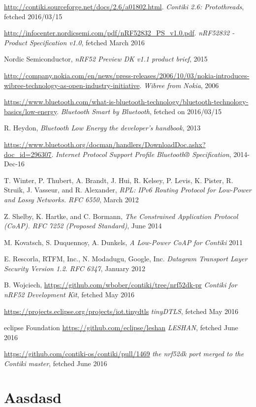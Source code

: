 \documentclass{article}
\begin{document}
\begin{thebibliography}{9}

 \url{http://contiki.sourceforge.net/docs/2.6/a01802.html}.
\emph{Contiki 2.6: Protothreads}, fetched 2016/03/15

\url{http://infocenter.nordicsemi.com/pdf/nRF52832_PS_v1.0.pdf}.
\emph{nRF52832 - Product Specification v1.0}, fetched March 2016

 Nordic Semiconductor,
\emph{nRF52 Preview DK v1.1 product brief}, 2015

 \url{http://company.nokia.com/en/news/press-releases/2006/10/03/nokia-introduces-wibree-technology-as-open-industry-initiative}.
\emph{Wibree from Nokia}, 2006

 \url{https://www.bluetooth.com/what-is-bluetooth-technology/bluetooth-technology-basics/low-energy}.
\emph{Bluetooth Smart by Bluetooth}, fetched on 2016/03/15

 R. Heydon,
\emph{Bluetooth Low Energy the developer's handbook}, 2013

 \url{https://www.bluetooth.org/docman/handlers/DownloadDoc.ashx?doc_id=296307}.
\emph{Internet Protocol Support Profile Bluetooth® Specification}, 2014-Dec-16

 T. Winter, P. Thubert, A. Brandt, J. Hui, R. Kelsey, P. Levis, K. Pister, R. Struik, J. Vasseur, and R. Alexander,
\emph{RPL: IPv6 Routing Protocol for Low-Power and Lossy Networks. RFC 6550}, March 2012

 Z. Shelby, K. Hartke, and C. Bormann,
\emph{The Constrained Application Protocol (CoAP). RFC 7252 (Proposed Standard)}, June 2014

 M. Kovatsch, S. Duquennoy, A. Dunkels, 
\emph{A Low-Power CoAP for Contiki}
2011

 E. Rescorla, RTFM, Inc., N. Modadugu, Google, Inc.
\emph{Datagram Transport Layer Security Version 1.2. RFC 6347}, January 2012

 B. Wojciech,
\url{https://github.com/wbober/contiki/tree/nrf52dk-pr}
\emph{Contiki for nRF52 Development Kit}, fetched May 2016

\url{https://projects.eclipse.org/projects/iot.tinydtls}
\emph{tinyDTLS}, fetched May 2016

 eclipse Foundation
\url{https://github.com/eclipse/leshan}
\emph{LESHAN}, fetched June 2016

\url{https://github.com/contiki-os/contiki/pull/1469}
\emph{the nrf52dk port merged to the Contiki master}, fetched June 2016

\end{thebibliography}
\newpage

\appendix
\section{Aasdasd}
\end{document}
